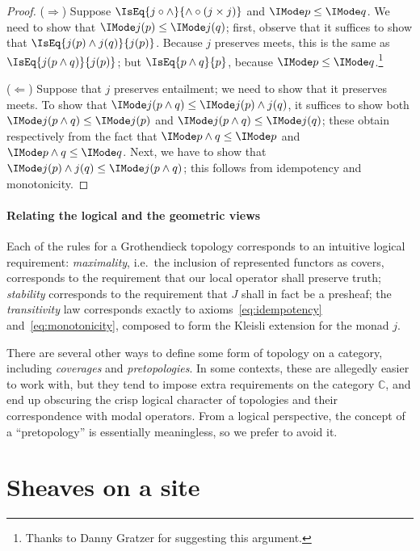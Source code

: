 \documentclass{article}
\begin{document}
\begin{proof}
  ($\Rightarrow$) Suppose $\IsEq{j\circ\land}{\land\circ(j\times j)}$
  and $\Entails{p}{q}$. We need to show that $\Entails{j(p)}{j(q)}$;
  first, observe that it suffices to show that
  $\IsEq{j(p)\land j(q)}{j(p)}$. Because $j$ preserves meets, this is
  the same as $\IsEq{j(p\land q)}{j(p)}$; but $\IsEq{p\land q}{p}$,
  because $\Entails{p}{q}$.\footnote{Thanks to Danny Gratzer for
    suggesting this argument.}

  ($\Leftarrow$) Suppose that $j$ preserves entailment; we need to
  show that it preserves meets. To show that
  $\Entails{j(p\land q)}{j(p)\land j(q)}$, it suffices to show both
  $\Entails{j(p\land q)}{j(p)}$ and $\Entails{j(p\land q)}{j(q)}$;
  these obtain respectively from the fact that $\Entails{p\land q}{p}$
  and $\Entails{p\land q}{q}$. Next, we have to show that
  $\Entails{j(p)\land j(q)}{j(p\land q)}$; this follows from
  idempotency and monotonicity.
\end{proof}

\paragraph{Relating the logical and the geometric views}

Each of the rules for a Grothendieck topology corresponds to an
intuitive logical requirement: \emph{maximality}, i.e.\ the inclusion
of represented functors as covers, corresponds to the requirement that
our local operator shall preserve truth; \emph{stability} corresponds
to the requirement that $J$ shall in fact be a presheaf; the
\emph{transitivity} law corresponds exactly to
axioms~\ref{eq:idempotency} and~\ref{eq:monotonicity}, composed to
form the Kleisli extension for the monad $j$.

\begin{remark}
  There are several other ways to define some form of topology on a
  category, including \emph{coverages} and \emph{pretopologies}. In
  some contexts, these are allegedly easier to work with, but they
  tend to impose extra requirements on the category $\mathbb{C}$, and
  end up obscuring the crisp logical character of topologies and their
  correspondence with modal operators. From a logical perspective, the
  concept of a ``pretopology'' is essentially meaningless, so we
  prefer to avoid it.
\end{remark}

\section{Sheaves on a site}
\newcommand\IsMono[2]{\Mono{\IMode{#1}}{\IMode{#2}}}
\end{document}
